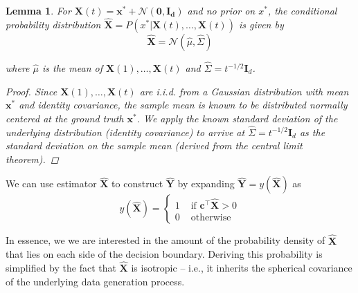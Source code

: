 \documentclass[12pt]{article}
\newtheorem{lemma}{Lemma}
\begin{document}
\begin{lemma}
	\label{lemma:x_star_estimate}
	For $\mathbf X(t) = \mathbf x^* + \mathcal N(\mathbf{0, I_d})$ and no prior on $x^*$, the conditional probability distribution $\hat{\mathbf X} = P(x^* | \mathbf X(t), \dots, \mathbf X(t))$ is given by 
	\begin{equation}
		\hat{\mathbf X} = \mathcal N(\hat \mu, \hat \Sigma)
	\end{equation}

	where $\hat \mu$ is the mean of $\mathbf X(1), \dots, \mathbf X(t)$ and $\hat \Sigma = t^{-1/2} \mathbf I_d$. 

	\begin{proof}
		Since $\mathbf X(1), \dots, \mathbf X(t)$ are i.i.d. from a Gaussian distribution with mean $\mathbf x^*$ and identity covariance, the sample mean is known to be distributed normally centered at the ground truth $\mathbf x^*$. 
		We apply the known standard deviation of the underlying distribution (identity covariance) to arrive at $\hat \Sigma = t^{-1/2} \mathbf I_d$ as the standard deviation on the sample mean (derived from the central limit theorem). 
	\end{proof}
\end{lemma}


We can use estimator $\hat{\mathbf X}$ to construct $\hat{\mathbf Y}$ by expanding $\hat{\mathbf Y} = y(\hat{\mathbf X})$ as 
\begin{equation}
	y(\hat{\mathbf X}) = \begin{cases}
		1 & \text{ if } \mathbf c^\top \hat{\mathbf X} > 0 \\ 
		0 & \text{ otherwise } 
	\end{cases}
\end{equation}

In essence, we we are interested in the amount of the probability density of $\hat{\mathbf X}$ that lies on each side of the decision boundary. 
Deriving this probability is simplified by the fact that $\hat{\mathbf X}$ is isotropic -- i.e., it inherits the spherical covariance of the underlying data generation process. 
\end{document}
